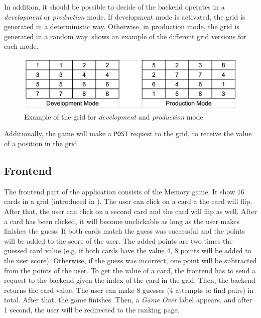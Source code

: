 In addition, it should be possible to decide of the backend operates in a \textit{development} or \textit{production} mode.
If development mode is activated, the grid is generated in a deterministic way.
Otherwise, in production mode, the grid is generated in a random way.
 shows an example of the different grid versions for each mode.
\begin{figure}[h]
\centering
\includegraphics[scale=0.2]{images/02_design/backend/grid-dev-prod-mode.png}
\caption{Example of the grid for \textit{development} and \textit{production} mode}
\label{fig:02_design_backend_grid_grid}
\end{figure}

Additionally, the game will make a \texttt{POST} request to the grid, to receive the value of a position in the grid.


\subsection{Frontend}\label{subsec:02_design_frontend}
The frontend part of the application consists of the Memory game.
It show 16 cards in a grid (introduced in ). The user can click on a card a the card will flip. After that, the user can click on a second card and the card will flip as well. After a card has been clicked, it will become unclickable as long as the user makes finishes the guess.
If both cards match the guess was successful and the points will be added to the score of the user. The added points are two times the guessed card value (e.g. if both cards have the value 4, 8 points will be added to the user score). Otherwise, if the guess was incorrect, one point will be subtracted from the points of the user.
To get the value of a card, the frontend has to send a request to the backend given the index of the card in the grid. Then, the backend returns the card value.
The user can make 8 guesses (4 attempts to find pairs) in total. After that, the game finishes. Then, a \textit{Game Over} label appears, and after 1 second, the user will be redirected to the ranking page.

